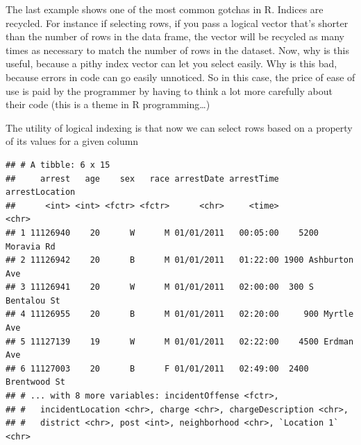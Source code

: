 \documentclass[]{article}
\newenvironment{Shaded}{\begin{snugshade}}{\end{snugshade}}
\newcommand{\KeywordTok}[1]{\textcolor[rgb]{0.13,0.29,0.53}{\textbf{{#1}}}}
\newcommand{\DecValTok}[1]{\textcolor[rgb]{0.00,0.00,0.81}{{#1}}}
\newcommand{\StringTok}[1]{\textcolor[rgb]{0.31,0.60,0.02}{{#1}}}
\newcommand{\CommentTok}[1]{\textcolor[rgb]{0.56,0.35,0.01}{\textit{{#1}}}}
\newcommand{\NormalTok}[1]{{#1}}
\theoremstyle{definition}
\theoremstyle{definition}
\theoremstyle{remark}
\begin{document}
The last example shows one of the most common gotchas in R. Indices are
recycled. For instance if selecting rows, if you pass a logical vector
that's shorter than the number of rows in the data frame, the vector
will be recycled as many times as necessary to match the number of rows
in the dataset. Now, why is this useful, because a pithy index vector
can let you select easily. Why is this bad, because errors in code can
go easily unnoticed. So in this case, the price of ease of use is paid
by the programmer by having to think a lot more carefully about their
code (this is a theme in R programming\ldots{})

The utility of logical indexing is that now we can select rows based on
a property of its values for a given column

\begin{Shaded}
\end{Shaded}

\begin{verbatim}
## # A tibble: 6 x 15
##     arrest   age    sex   race arrestDate arrestTime     arrestLocation
##      <int> <int> <fctr> <fctr>      <chr>     <time>              <chr>
## 1 11126940    20      W      M 01/01/2011   00:05:00    5200 Moravia Rd
## 2 11126942    20      B      M 01/01/2011   01:22:00 1900 Ashburton Ave
## 3 11126941    20      W      M 01/01/2011   02:00:00  300 S Bentalou St
## 4 11126955    20      B      M 01/01/2011   02:20:00     900 Myrtle Ave
## 5 11127139    19      W      M 01/01/2011   02:22:00    4500 Erdman Ave
## 6 11127003    20      B      F 01/01/2011   02:49:00  2400 Brentwood St
## # ... with 8 more variables: incidentOffense <fctr>,
## #   incidentLocation <chr>, charge <chr>, chargeDescription <chr>,
## #   district <chr>, post <int>, neighborhood <chr>, `Location 1` <chr>
\end{verbatim}

\begin{Shaded}
\end{Shaded}
\end{document}
